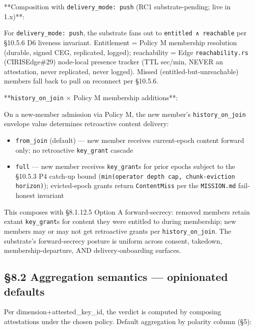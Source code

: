 \documentclass[11pt]{article}
\begin{document}
**Composition with \texttt{delivery\_mode: push} (RC1 substrate-pending; live in 1.x)**:


For \texttt{delivery\_mode: push}, the substrate fans out to \texttt{entitled ∧ reachable} per §10.5.6 D6 liveness invariant. Entitlement = Policy M membership resolution (durable, signed CEG, replicated, logged); reachability = Edge \texttt{reachability.rs} (CIRISEdge\#29) node-local presence tracker (TTL sec/min, NEVER an attestation, never replicated, never logged). Missed (entitled-but-unreachable) members fall back to pull on reconnect per §10.5.6.


**\texttt{history\_on\_join} × Policy M membership additions**:


On a new-member admission via Policy M, the new member's \texttt{history\_on\_join} envelope value determines retroactive content delivery:


\begin{itemize}\setlength\itemsep{0pt}
\item \texttt{from\_join} (default) — new member receives current-epoch content forward only; no retroactive \texttt{key\_grant} cascade
\item \texttt{full} — new member receives \texttt{key\_grant}s for prior epochs subject to the §10.5.3 P4 catch-up bound (\texttt{min(operator depth cap, chunk-eviction horizon)}); evicted-epoch grants return \texttt{ContentMiss} per the \texttt{MISSION.md} fail-honest invariant
\end{itemize}


This composes with §8.1.12.5 Option A forward-secrecy: removed members retain extant \texttt{key\_grant}s for content they were entitled to during membership; new members may or may not get retroactive grants per \texttt{history\_on\_join}. The substrate's forward-secrecy posture is uniform across consent, takedown, membership-departure, AND delivery-onboarding surfaces.


\subsection*{§8.2 Aggregation semantics — opinionated defaults}


Per dimension+attested\_key\_id, the verdict is computed by composing attestations under the chosen policy. Default aggregation by polarity column (§5):
\end{document}
